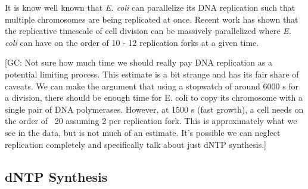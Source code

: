 It is know well known that \textit{E. coli} can parallelize its DNA replication
such that multiple chromosomes are being replicated at once. Recent work
\citep{si2017} has shown that the replicative timescale of cell division can be
massively parallelized where \textit{E. coli} can have on the order of 10 - 12
replication forks at a given time.  


[GC: Not sure how much time we should really pay DNA replication as a potential
limiting process. This estimate is a bit strange and has its fair share of
caveats. We can make the argument that using a stopwatch of around 6000 s for a
division, there should be enough time for E. coli to copy its chromosome with a
single pair of DNA polymerases. However, at 1500 s (fast growth), a cell needs
on the order of ~20 assuming 2 per replication fork. This is approximately what
we see in the data, but is not much of an estimate. It's possible we can neglect
replication completely and specifically talk about just dNTP synthesis.]


\subsection{dNTP Synthesis}